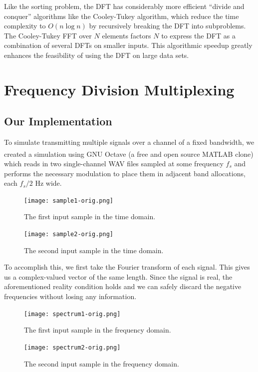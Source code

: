 \documentclass[12pt]{article}
\begin{document}
Like the sorting problem, the DFT has considerably more efficient ``divide
and conquer'' algorithms like the Cooley-Tukey algorithm, which reduce the
time complexity to \(O(n \log{n})\) by recursively breaking the DFT into
subproblems. The Cooley-Tukey FFT over \(N\) elements factors \(N\) to express
the DFT as a combination of several DFTs on smaller inputs. This algorithmic
speedup greatly enhances the feasibility of using the DFT on large data sets.

\section{Frequency Division Multiplexing}

\subsection{Our Implementation}
To simulate transmitting multiple signals over a channel of a fixed bandwidth,
we created a simulation using GNU Octave (a free and open source
MATLAB\textsuperscript{\textregistered} clone) which reads in two
single-channel WAV files sampled at some frequency \(f_s\) and performs the
necessary modulation to place them in adjacent band allocations, each \(f_s/2\)
Hz wide.

\begin{figure}[H]
\hspace*{-.35 in}
\begin{minipage}[t]{0.5\linewidth}
\centering
\texttt{[image: sample1-orig.png]}
\caption{The first input sample in the time domain.}
\label{fig:figure1}
\end{minipage}
\hspace{0.5cm}
\begin{minipage}[t]{0.5\linewidth}
\centering
\texttt{[image: sample2-orig.png]}
\caption{The second input sample in the time domain.}
\label{fig:figure2}
\end{minipage}
\end{figure}

To accomplish this, we first take the Fourier transform of each signal. This
gives us a complex-valued vector of the same length. Since the signal is real,
the aforementioned reality condition holds and we can safely discard the
negative frequencies without losing any information. 

\begin{figure}[H]
\hspace*{-.35 in}
\begin{minipage}[t]{0.5\linewidth}
\centering
\texttt{[image: spectrum1-orig.png]}
\caption{The first input sample in the frequency domain.}
\label{fig:figure4}
\end{minipage}
\hspace{0.5cm}
\begin{minipage}[t]{0.5\linewidth}
\centering
\texttt{[image: spectrum2-orig.png]}
\caption{The second input sample in the frequency domain.}
\label{fig:figure4}
\end{minipage}
\end{figure}
\end{document}

